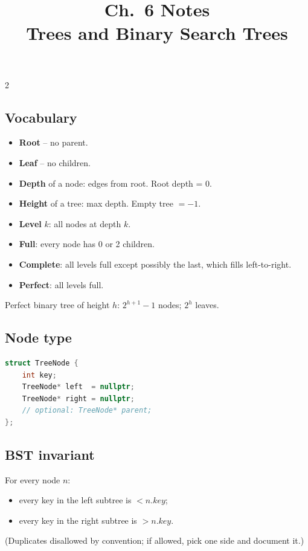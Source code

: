\documentclass[10pt]{article}
\title{Ch.~6 Notes\\\large Trees and Binary Search Trees}
\author{}
\date{}
\begin{document}
\maketitle
\vspace{-2em}

\begin{multicols}{2}

\subsection*{Vocabulary}
\begin{itemize}
    \item \textbf{Root} -- no parent.
    \item \textbf{Leaf} -- no children.
    \item \textbf{Depth} of a node: edges from root. Root depth = 0.
    \item \textbf{Height} of a tree: max depth. Empty tree $= -1$.
    \item \textbf{Level} $k$: all nodes at depth $k$.
    \item \textbf{Full}: every node has 0 or 2 children.
    \item \textbf{Complete}: all levels full except possibly the last,
    which fills left-to-right.
    \item \textbf{Perfect}: all levels full.
\end{itemize}
Perfect binary tree of height $h$: $2^{h+1} - 1$ nodes; $2^h$ leaves.

\subsection*{Node type}
\begin{lstlisting}[language=C++]
struct TreeNode {
    int key;
    TreeNode* left  = nullptr;
    TreeNode* right = nullptr;
    // optional: TreeNode* parent;
};
\end{lstlisting}

\subsection*{BST invariant}
For every node $n$:
\begin{itemize}
    \item every key in the left subtree is $< n.key$;
    \item every key in the right subtree is $> n.key$.
\end{itemize}
(Duplicates disallowed by convention; if allowed, pick one side and
document it.)


\end{multicols}
\end{document}
